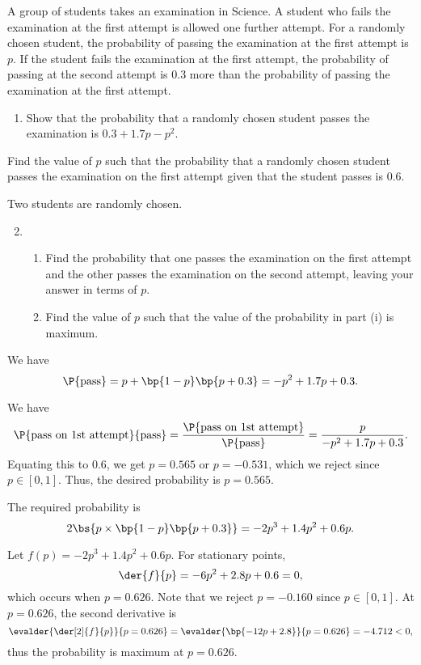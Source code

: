 \begin{problem}
    A group of students takes an examination in Science. A student who fails the examination at the first attempt is allowed one further attempt. For a randomly chosen student, the probability of passing the examination at the first attempt is $p$. If the student fails the examination at the first attempt, the probability of passing at the second attempt is $0.3$ more than the probability of passing the examination at the first attempt.

    \begin{enumerate}
        \item Show that the probability that a randomly chosen student passes the examination is $0.3 + 1.7p - p^2$.
    \end{enumerate}

    Find the value of $p$ such that the probability that a randomly chosen student passes the examination on the first attempt given that the student passes is $0.6$.

    Two students are randomly chosen.

    \begin{enumerate}
        \setcounter{enumi}{1}
        \item \begin{enumerate}
            \item Find the probability that one passes the examination on the first attempt and the other passes the examination on the second attempt, leaving your answer in terms of $p$.
            \item Find the value of $p$ such that the value of the probability in part (i) is maximum.
        \end{enumerate}
    \end{enumerate}
\end{problem}
\begin{solution}
    \begin{ppart}
        We have \[\P{\text{pass}} = p + \bp{1 - p}\bp{p + 0.3} = -p^2 + 1.7p + 0.3.\]
    \end{ppart}
    \begin{ppart}
        We have \[\P{\text{pass on 1st attempt}}{\text{pass}} = \frac{\P{\text{pass on 1st attempt}}}{\P{\text{pass}}} = \frac{p}{-p^2 + 1.7p + 0.3}.\] Equating this to $0.6$, we get $p = 0.565$ or $p = -0.531$, which we reject since $p \in [0, 1]$. Thus, the desired probability is $p = 0.565$.
    \end{ppart}
    \begin{ppart}
        The required probability is \[2\bs{p \times \bp{1-p}\bp{p+0.3}} = -2p^3 + 1.4p^2 + 0.6p.\]
    \end{ppart}
    \begin{ppart}
        Let $f(p) = -2p^3 + 1.4p^2 + 0.6p$. For stationary points, \[\der{f}{p} = -6p^2 + 2.8p + 0.6 = 0,\] which occurs when $p = 0.626$. Note that we reject $p = -0.160$ since $p \in [0, 1]$. At $p = 0.626$, the second derivative is \[\evalder{\der[2]{f}{p}}{p=0.626} = \evalder{\bp{-12p + 2.8}}{p = 0.626} = -4.712 < 0,\] thus the probability is maximum at $p = 0.626$.
    \end{ppart}
\end{solution}


